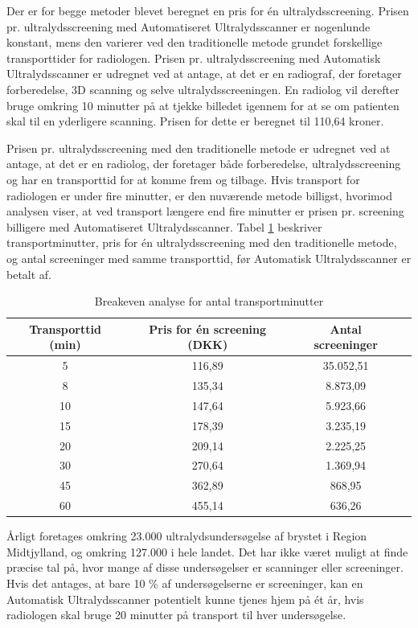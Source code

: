 Der er for begge metoder blevet beregnet en pris for én ultralydsscreening. Prisen pr. ultralydsscreening med Automatiseret Ultralydsscanner er nogenlunde konstant, mens den varierer ved den traditionelle metode grundet forskellige transporttider for radiologen.  
Prisen pr. ultralydsscreening med Automatisk Ultralydsscanner er udregnet ved at antage, at det er en radiograf, der foretager forberedelse, 3D scanning og selve ultralydsscreeningen. En radiolog vil derefter bruge omkring 10 minutter på at tjekke billedet igennem for at se om patienten skal til en yderligere scanning. Prisen for dette er beregnet til 110,64 kroner. 

Prisen pr. ultralydsscreening med den traditionelle metode er udregnet ved at antage, at det er en radiolog, der foretager både forberedelse, ultralydsscreening og har en transporttid for at komme frem og tilbage. Hvis transport for radiologen er under fire minutter, er den nuværende metode billigst, hvorimod analysen viser, at ved transport længere end fire minutter er prisen pr. screening billigere med Automatiseret Ultralydsscanner.  
Tabel \ref{Breakeven} beskriver transportminutter, pris for én ultralydsscreening med den traditionelle metode, og antal screeninger med samme transporttid, før Automatisk Ultralydsscanner er betalt af. 

\begin{table}[htb]
\centering
\begin{tabular}{ | c | c | c | p{} | }
\hline
\textbf{Transporttid (min)} & \textbf{Pris for én screening (DKK)} & \textbf{Antal screeninger} \\\hline
5 & 116,89 & 35.052,51 \\\hline
8 & 135,34 & 8.873,09\\\hline
10 & 147,64 & 5.923,66\\\hline
15 & 178,39 & 3.235,19 \\\hline
20 & 209,14 & 2.225,25\\\hline
30 & 270,64 & 1.369,94\\\hline
45 & 362,89 & 868,95 \\\hline
60 & 455,14 & 636,26 \\\hline
\end{tabular}
\caption{Breakeven analyse for antal transportminutter}
\label{Breakeven}
\end{table}

Årligt foretages omkring 23.000 ultralydsundersøgelse af brystet i Region Midtjylland, og omkring 127.000 i hele landet. Det har ikke været muligt at finde præcise tal på, hvor mange af disse undersøgelser er scanninger eller screeninger. Hvis det antages, at bare 10 \% af undersøgelserne er screeninger, kan en Automatisk Ultralydsscanner potentielt kunne tjenes hjem på ét år, hvis radiologen skal bruge 20 minutter på transport til hver undersøgelse. 

